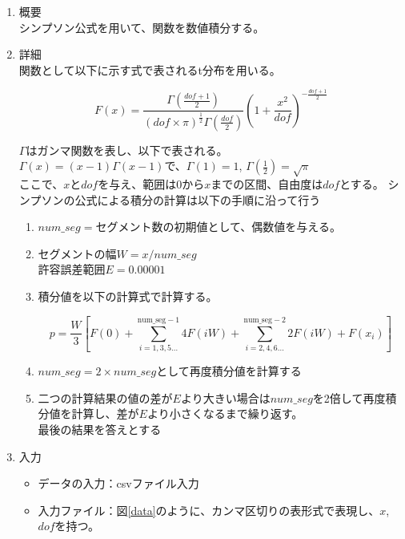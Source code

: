 \documentclass[titlepage,a4paper,12pt]{ltjsreport}
\begin{document}

\begin{enumerate}
    \item 概要 \mbox{}\\
    シンプソン公式を用いて、関数を数値積分する。

    \item 詳細\mbox{}\\
    関数として以下に示す式で表されるt分布を用いる。
    
    \[
    F(x) = \frac{ \Gamma\left( \frac{dof + 1}{2} \right) }
    { (dof \times \pi)^{\frac{1}{2}} \Gamma\left( \frac{dof}{2} \right) }
    \left( 1 + \frac{x^2}{dof} \right)^{- \frac{dof + 1}{2}}
    \]

    $\Gamma$はガンマ関数を表し、以下で表される。\\
    $\Gamma(x) = (x - 1)\Gamma(x - 1)$で、$\Gamma(1) = 1$, $\Gamma(\frac{1}{2}) = \sqrt{\pi}$\\
    
    ここで、$x$と$dof$を与え、範囲は0から$x$までの区間、自由度は$dof$とする。
    シンプソンの公式による積分の計算は以下の手順に沿って行う

    \begin{enumerate}
        \item $num\_seg = $セグメント数の初期値として、偶数値を与える。
        \item セグメントの幅$W = x/num\_seg$\\ 許容誤差範囲$E = 0.00001$
        \item 積分値を以下の計算式で計算する。
        
        \[
        p = \frac{W}{3} \left[ F(0) + \sum_{i=1,3,5\dots}^{\text{num\_seg}-1} 4F(iW) + \sum_{i=2,4,6\dots}^{\text{num\_seg}-2} 2F(iW) + F(x_i) \right]
        \]

        \item $num\_seg = 2 \times num\_seg$として再度積分値を計算する
        \item 二つの計算結果の値の差が$E$より大きい場合は$num\_seg$を2倍して再度積分値を計算し、差が$E$より小さくなるまで繰り返す。\\最後の結果を答えとする

    \end{enumerate}


    \item 入力\mbox{}\\
    
    \begin{itemize}
        \item データの入力：csvファイル入力
        \item 入力ファイル：図\ref{data}のように、カンマ区切りの表形式で表現し、$x$,$dof$を持つ。\\
        

\end{itemize}
\end{enumerate}
\end{document}

